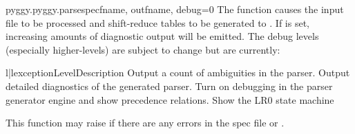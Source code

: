 \begin{funcdesc}{pyggy.pyggy.parsespec}{fname, outfname, debug=0}
The  function causes the input file 
to be processed and shift-reduce tables to be generated to
.  If  is set, increasing amounts of diagnostic
output will be emitted.  The debug levels (especially higher-levels)
are subject to change but are currently:

\begin{tableii}{l|l}{exception}{Level}{Description}
   {Output a count of ambiguities in the parser.}
   {Output detailed diagnostics of the generated parser.}
   {Turn on debugging in the parser generator engine and show precedence relations.}
   {Show the LR0 state machine}
\end{tableii}

This function may raise  if there are any
errors in the spec file or .
\end{funcdesc}

